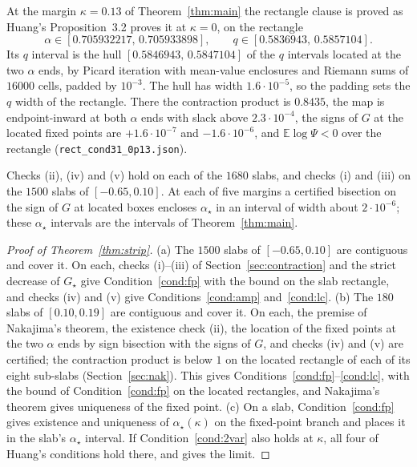 \documentclass[11pt]{article}
\theoremstyle{remark}
\newcommand{\E}{\mathbb{E}}
\begin{document}
At the margin $\kappa=0.13$ of Theorem~\ref{thm:main} the rectangle
clause is proved as Huang's Proposition~3.2 proves it at
$\kappa=0$, on the rectangle
\[
\alpha\in[0.705932217,\,0.705933898],\qquad q\in[0.5836943,\,0.5857104].
\]
Its $q$ interval is the hull $[0.5846943,\,0.5847104]$ of
the $q$ intervals located at the two $\alpha$ ends, by Picard iteration
with mean-value enclosures and Riemann sums of $16000$ cells, padded by
$10^{-3}$.  The hull has
width $1.6\cdot10^{-5}$, so the padding sets the $q$ width of the
rectangle.  There the
contraction product is $0.8435$, the map is endpoint-inward at both
$\alpha$ ends with slack above $2.3\cdot10^{-4}$, the signs of $G$ at
the located fixed points are $+1.6\cdot10^{-7}$ and
$-1.6\cdot10^{-6}$, and $\E\log\Psi<0$ over the rectangle
(\texttt{rect\_cond31\_0p13.json}).

Checks (ii), (iv) and (v) hold on each of the $1680$ slabs, and checks
(i) and (iii) on the $1500$ slabs of $[-0.65,0.10]$.
At each of five margins a certified bisection on the sign of $G$ at
located boxes encloses $\alpha_\star$ in an interval of width about
$2\cdot10^{-6}$; these
$\alpha_\star$ intervals are the intervals of Theorem~\ref{thm:main}.

\begin{proof}[Proof of Theorem~\ref{thm:strip}]
(a) The $1500$ slabs of $[-0.65,0.10]$ are contiguous and cover it.
On each, checks (i)--(iii) of Section~\ref{sec:contraction} and the
strict decrease of $G_\star$ give Condition~\ref{cond:fp} with the
bound on the slab rectangle, and checks (iv) and (v) give
Conditions~\ref{cond:amp} and~\ref{cond:lc}.
(b) The $180$ slabs of $[0.10,0.19]$ are contiguous and cover it.  On
each, the premise of Nakajima's theorem, the existence check (ii), the
location of the fixed points at the two $\alpha$ ends by sign
bisection with the signs of $G$, and checks (iv) and (v) are certified;
the contraction product is below $1$ on the located rectangle of each
of its eight sub-slabs (Section~\ref{sec:nak}).  This gives
Conditions~\ref{cond:fp}--\ref{cond:lc}, with the bound of
Condition~\ref{cond:fp} on the located rectangles, and Nakajima's
theorem gives uniqueness of the fixed point.
(c) On a slab, Condition~\ref{cond:fp} gives existence and uniqueness
of $\alpha_\star(\kappa)$ on the fixed-point branch and places it in
the slab's $\alpha_\star$ interval.  If Condition~\ref{cond:2var} also
holds at $\kappa$, all four of Huang's conditions hold there, and
\cite[Theorem~3.6]{huang2024capacity} gives the limit.
\end{proof}
\end{document}
